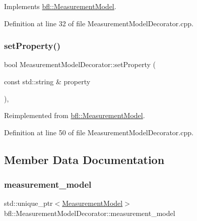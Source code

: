 Implements \mbox{\hyperlink{classbfl_1_1MeasurementModel_a8fc8798aa2db48f428d4ce59b33b5307}{bfl\+::\+Measurement\+Model}}.



Definition at line 32 of file Measurement\+Model\+Decorator.\+cpp.

\mbox{\label{classbfl_1_1MeasurementModelDecorator_a531a891152d7bf83e56370664d54f42f}} 
\subsubsection{\texorpdfstring{set\+Property()}{setProperty()}}
{\footnotesize\ttfamily bool Measurement\+Model\+Decorator\+::set\+Property (\begin{DoxyParamCaption}\item[{const std\+::string \&}]{property }\end{DoxyParamCaption})\hspace{0.3cm}{\ttfamily [override]}, {\ttfamily [virtual]}}



Reimplemented from \mbox{\hyperlink{classbfl_1_1MeasurementModel_af97e18b52d1a3f365dd5982b8cc4aff7}{bfl\+::\+Measurement\+Model}}.



Definition at line 50 of file Measurement\+Model\+Decorator.\+cpp.



\subsection{Member Data Documentation}
\mbox{\label{classbfl_1_1MeasurementModelDecorator_a7d85e1d15d21ba2d0a70f86368628cf7}} 
\subsubsection{\texorpdfstring{measurement\+\_\+model}{measurement\_model}}
{\footnotesize\ttfamily std\+::unique\+\_\+ptr$<$\mbox{\hyperlink{classbfl_1_1MeasurementModel}{Measurement\+Model}}$>$ bfl\+::\+Measurement\+Model\+Decorator\+::measurement\+\_\+model\hspace{0.3cm}{\ttfamily [private]}}



